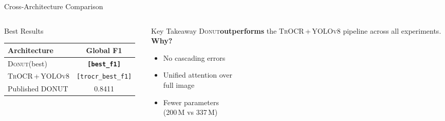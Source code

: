 \documentclass[aspectratio=169,11pt]{beamer}
\newcommand{\VAR}[1]{\texttt{[#1]}\xspace}
\newcommand{\donut}{\textsc{Donut}\xspace}
\newcommand{\trocr}{\textsc{TrOCR}\xspace}
\newcommand{\yolo}{\textsc{YOLOv8}\xspace}
\newcommand{\hlnum}[1]{\textcolor{AccentTeal}{\textbf{#1}}}
\newcommand{\greenbf}[1]{\textcolor{GoodGreen}{\textbf{#1}}}
\begin{document}
\begin{frame}{Cross-Architecture Comparison}
  \begin{columns}[T]
    \begin{column}{0.50\textwidth}
      \begin{block}{Best Results}
        \centering
        \vspace{0.3cm}
        \begin{tabular}{@{}lc@{}}
          \toprule
          \textbf{Architecture} & \textbf{Global F1} \\
          \midrule
          \donut (best)       & \hlnum{\VAR{best_f1}} \\
          \trocr\,+\,\yolo    & \VAR{trocr_best_f1} \\
          \midrule
          Published DONUT     & 0.8411 \\
          \bottomrule
        \end{tabular}
        \vspace{0.3cm}
      \end{block}
    \end{column}
    \begin{column}{0.47\textwidth}
      \begin{exampleblock}{Key Takeaway}
        \donut \greenbf{outperforms} the \trocr\,+\,\yolo pipeline
        across all experiments.\\[6pt]
        \textbf{Why?}
        \begin{itemize}
          \item No cascading errors
          \item Unified attention over\\full image
          \item Fewer parameters\\(200\,M vs 337\,M)
        \end{itemize}
      \end{exampleblock}
    \end{column}
  \end{columns}
\end{frame}
\end{document}
